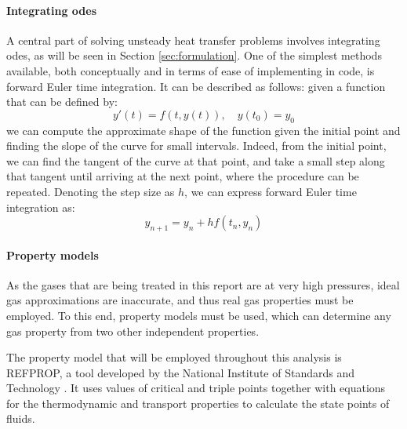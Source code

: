 \paragraph{Integrating \glspl{ode}}

A central part of solving unsteady heat transfer problems involves integrating \glspl{ode}, as will be seen in Section \ref{sec:formulation}. One of the simplest methods available, both conceptually and in terms of ease of implementing in code, is forward Euler time integration. It can be described as follows: given a function that can be defined by: 
\begin{equation}
y'(t) = f(t,y(t)), \quad y(t_0) = y_0
\end{equation}
we can compute the approximate shape of the function given the initial point and finding the slope of the curve for small intervals. Indeed, from the initial point, we can find the tangent of the curve at that point, and take a small step along that tangent until arriving at the next point, where the procedure can be repeated. Denoting the step size as $h$, we can express forward Euler time integration as:
\begin{equation}
y_{n+1} =  y_n + hf(t_n,y_n)
\end{equation}

\paragraph{Property models}
\label{sec:property_models}
As the gases that are being treated in this report are at very high pressures, ideal gas approximations are inaccurate, and thus real gas properties must be employed. To this end, property models must be used, which can determine any gas property from two other independent properties.

The property model that will be employed throughout this analysis is REFPROP, a tool developed by the National Institute of Standards and Technology \cite{refprop}. It uses values of critical and triple points together with equations for the thermodynamic and transport properties to calculate the state points of fluids.



